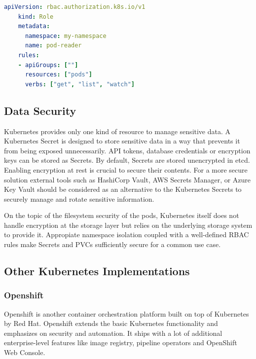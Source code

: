 \begin{lstlisting}[language=YAML, caption={[An example of a Kubernetes Role definition] An example of a Kubernetes Role definition.}, label={lst:k8s-role}]
    apiVersion: rbac.authorization.k8s.io/v1
    kind: Role
    metadata:
      namespace: my-namespace
      name: pod-reader
    rules:
    - apiGroups: [""]
      resources: ["pods"]
      verbs: ["get", "list", "watch"]
\end{lstlisting}

\subsection{Data Security}

Kubernetes provides only one kind of resource to manage sensitive data. A Kubernetes Secret is designed to store sensitive data in a way that prevents it from being exposed unnecessarily. API tokens, database credentials or encryption keys can be stored as Secrets. By default, Secrets are stored unencrypted in etcd. Enabling encryption at rest is crucial to secure their contents. For a more secure solution external tools such as HashiCorp Vault, AWS Secrets Manager, or Azure Key Vault should be considered as an alternative to the Kubernetes Secrets to securely manage and rotate sensitive information.

On the topic of the filesystem security of the pods, Kubernetes itself does not handle encryption at the storage layer but relies on the underlying storage system to provide it. Appropiate namespace isolation coupled with a well-defined RBAC rules make Secrets and PVCs sufficiently secure for a common use case.

\subsection{Other Kubernetes Implementations}
\label{sec:other-kubernetes-implementations}

\subsubsection*{Openshift}

Openshift is another container orchestration platform built on top of Kubernetes by Red Hat. Openshift extends the basic Kubernetes functionality and emphasizes on security and automation. It ships with a lot of additional enterprise-level features like image registry, pipeline operators and OpenShift Web Console.

